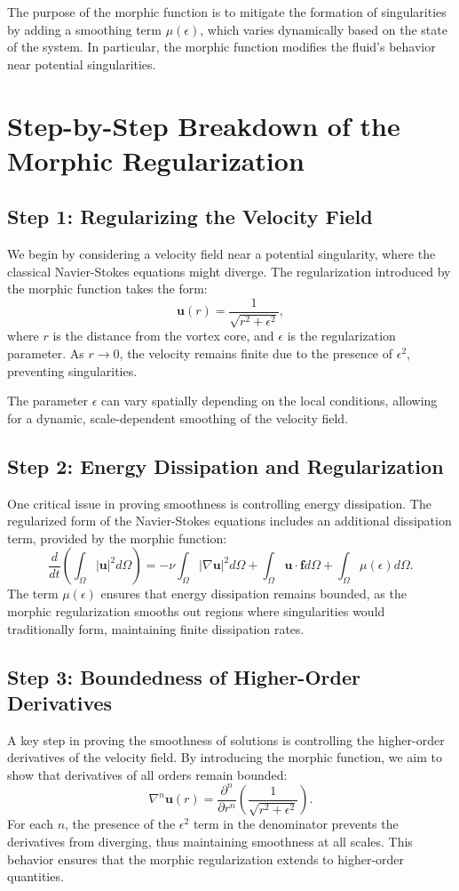 \documentclass{article}
\begin{document}
The purpose of the morphic function is to mitigate the formation of singularities by adding a smoothing term \( \mu(\epsilon) \), which varies dynamically based on the state of the system. In particular, the morphic function modifies the fluid’s behavior near potential singularities.

\section{Step-by-Step Breakdown of the Morphic Regularization}

\subsection{Step 1: Regularizing the Velocity Field}
We begin by considering a velocity field near a potential singularity, where the classical Navier-Stokes equations might diverge. The regularization introduced by the morphic function takes the form:
\[
\mathbf{u}(r) = \frac{1}{\sqrt{r^2 + \epsilon^2}},
\]
where \( r \) is the distance from the vortex core, and \( \epsilon \) is the regularization parameter. As \( r \to 0 \), the velocity remains finite due to the presence of \( \epsilon^2 \), preventing singularities.

The parameter \( \epsilon \) can vary spatially depending on the local conditions, allowing for a dynamic, scale-dependent smoothing of the velocity field.

\subsection{Step 2: Energy Dissipation and Regularization}
One critical issue in proving smoothness is controlling energy dissipation. The regularized form of the Navier-Stokes equations includes an additional dissipation term, provided by the morphic function:
\[
\frac{d}{dt} \left( \int_{\Omega} |\mathbf{u}|^2 d\Omega \right) = -\nu \int_{\Omega} |\nabla \mathbf{u}|^2 d\Omega + \int_{\Omega} \mathbf{u} \cdot \mathbf{f} d\Omega + \int_{\Omega} \mu(\epsilon) d\Omega.
\]
The term \( \mu(\epsilon) \) ensures that energy dissipation remains bounded, as the morphic regularization smooths out regions where singularities would traditionally form, maintaining finite dissipation rates.

\subsection{Step 3: Boundedness of Higher-Order Derivatives}
A key step in proving the smoothness of solutions is controlling the higher-order derivatives of the velocity field. By introducing the morphic function, we aim to show that derivatives of all orders remain bounded:
\[
\nabla^n \mathbf{u}(r) = \frac{\partial^n}{\partial r^n} \left( \frac{1}{\sqrt{r^2 + \epsilon^2}} \right).
\]
For each \( n \), the presence of the \( \epsilon^2 \) term in the denominator prevents the derivatives from diverging, thus maintaining smoothness at all scales. This behavior ensures that the morphic regularization extends to higher-order quantities.
\end{document}

